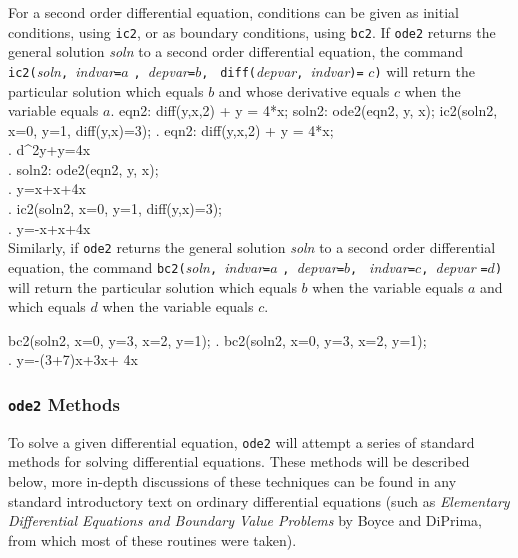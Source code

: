 \documentclass{article}
\begin{document}
For a second order differential equation, conditions can be given as
initial conditions, using \texttt{ic2}, or as boundary conditions,
using \texttt{bc2}.  If \texttt{ode2} returns the general solution
\textit{soln} to a second order differential equation, the command
\texttt{ic2(}\textit{soln}\texttt{, }\textit{indvar}\texttt{=}$a$%
\texttt{, }\textit{depvar}\texttt{=}$b$\texttt{, }%
\texttt{diff(}\textit{depvar}\texttt{, }\textit{indvar}\texttt{)=}%
$c$\texttt{)} will return the particular solution which
equals $b$ and whose derivative equals $c$ when the variable equals
$a$.
\beginmaximasession
eqn2: diff(y,x,2) + y = 4*x;
soln2: ode2(eqn2, y, x);
ic2(soln2, x=0, y=1, diff(y,x)=3);
\maximatexsession
{}.  eqn2: diff(y,x,2) + y = 4*x; \\
.   {{d^{2}}}\*y+y=4\*x \\
.  soln2: ode2(eqn2, y, x); \\
.   y=\*\sin x+\*\cos x+4\*x \\
.  ic2(soln2, x=0, y=1, diff(y,x)=3); \\
.   y=-\sin x+\cos x+4\*x \\
\endmaximasession
\noindent
Similarly, if \texttt{ode2} returns the general solution \textit{soln}
to a second order differential equation, the command 
\texttt{bc2(}\textit{soln}\texttt{, }\textit{indvar}\texttt{=}$a$%
\texttt{, }\textit{depvar}\texttt{=}$b$\texttt{, }%
\textit{indvar}\texttt{=}$c$\texttt{, }\textit{\mbox{depvar}}%
\texttt{=}$d$\texttt{)} will return the particular
solution which equals $b$ when the variable equals $a$
and which equals $d$ when the variable equals $c$.

\beginmaximasession
bc2(soln2, x=0, y=3, x=2, y=1);
\maximatexsession
{}.  bc2(soln2, x=0, y=3, x=2, y=1); \\
.   y=-{{\left(3\*+7\right)\*\sin x}}+3\*\cos x+
 4\*x \\
\endmaximasession


\subsubsection{\texttt{ode2} Methods}

To solve a given differential equation, \texttt{ode2} will attempt a
series of standard methods for solving differential equations.  These
methods will be described below, more in-depth discussions of these
techniques can be found in any standard introductory text on ordinary
differential equations (such as \textsl{Elementary Differential
  Equations and Boundary Value Problems} by Boyce and DiPrima, from 
which most of these routines were taken).
\end{document}
